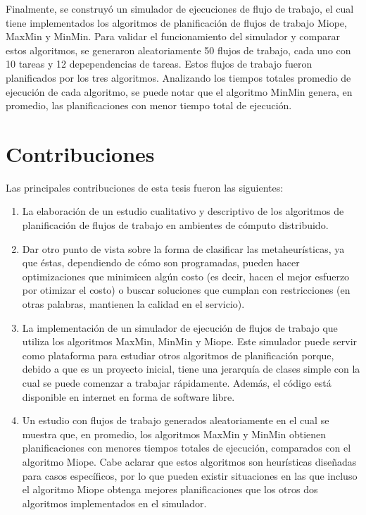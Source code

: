 Finalmente, se construyó un simulador de ejecuciones de flujo de trabajo, el cual tiene implementados los algoritmos de planificación de flujos de trabajo Miope, MaxMin y MinMin. Para validar el funcionamiento del simulador y comparar estos algoritmos, se generaron aleatoriamente 50 flujos de trabajo, cada uno con 10 tareas y 12 depependencias de tareas. Estos flujos de trabajo fueron planificados por los tres algoritmos. Analizando los tiempos totales promedio de ejecución de cada algoritmo, se puede notar que el algoritmo MinMin genera, en promedio, las planificaciones con menor tiempo total de ejecución.

\section{Contribuciones}
Las principales contribuciones de esta tesis fueron las siguientes:
\begin{enumerate}
\item La elaboración de un estudio cualitativo y descriptivo de los algoritmos de planificación de flujos de trabajo en ambientes de cómputo distribuido.
\item Dar otro punto de vista sobre la forma de clasificar las metaheurísticas, ya que éstas, dependiendo de cómo son programadas, pueden hacer optimizaciones que minimicen algún costo (es decir, hacen el mejor esfuerzo por otimizar el costo) o buscar soluciones que cumplan con restricciones (en otras palabras, mantienen la calidad en el servicio).
\item La implementación de un simulador de ejecución de flujos de trabajo que utiliza los algoritmos MaxMin, MinMin y Miope. Este simulador puede servir como plataforma para estudiar otros algoritmos de planificación porque, debido a que es un proyecto inicial, tiene una jerarquía de clases simple con la cual se puede comenzar a trabajar rápidamente. Además, el código está disponible en internet en forma de software libre.
\item Un estudio con flujos de trabajo generados aleatoriamente en el cual se muestra que, en promedio, los algoritmos MaxMin y MinMin obtienen planificaciones con menores tiempos totales de ejecución, comparados con el algoritmo Miope. Cabe aclarar que estos algoritmos son heurísticas diseñadas para casos específicos, por lo que pueden existir situaciones en las que incluso el algoritmo Miope obtenga mejores planificaciones que los otros dos algoritmos implementados en el simulador.
\end{enumerate}

